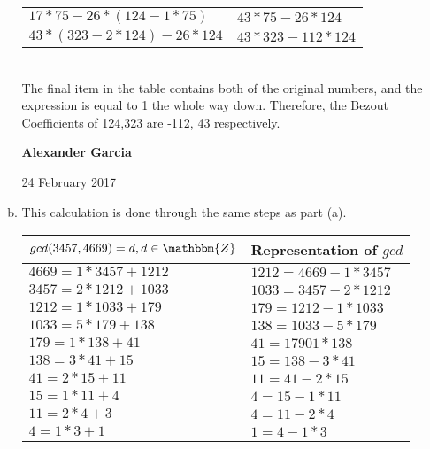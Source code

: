 \documentclass[11pt]{article}
\begin{document}
\begin{enumerate}
\begin{enumerate}[(a)]
\begin{tabular}{ll}
				$17 * 75 - 26 * (124 - 1 * 75)$ & $43 * 75 - 26 * 124$ \\

				$43 * (323 - 2 * 124) - 26 * 124$ & $43 * 323 - 112 * 124$ \\

			\end{tabular}\\

			The final item in the table contains both of the original numbers,
			and the expression is equal to 1 the whole way down. Therefore, the Bezout
			Coefficients of 124,323 are -112, 43 respectively. \\

			\newpage

			\textbf{Alexander Garcia}

			24 February 2017 \\

			\item This calculation is done through the same steps as part (a).
			
			\begin{tabular}{ll}
				$gcd(3457, 4669) = d, d \in \mathbbm{Z}$ & Representation of $gcd$ \\

				\hline

				$4669 = 1 * 3457 + 1212$ & $1212 = 4669 - 1 * 3457$ \\

				$3457 = 2 * 1212 + 1033$ & $1033 = 3457 - 2 * 1212$ \\

				$1212 = 1 * 1033 + 179$ & $179 = 1212 - 1 * 1033$ \\

				$1033 = 5 * 179 + 138$ & $138 = 1033 - 5 * 179$ \\

				$179 = 1 * 138 + 41$ & $41 = 179 0 1 * 138$ \\

				$138 = 3 * 41 + 15$ & $15 = 138 - 3 * 41$ \\

				$41 = 2 * 15 + 11$ & $11 = 41 - 2 * 15$ \\

				$15 = 1 * 11 + 4$ & $4 = 15 - 1 * 11$ \\

				$11 = 2 * 4 + 3$ & $4 = 11 - 2 * 4$ \\

				$4 = 1 * 3 + 1$ & $1 = 4 - 1 * 3$ \\


\end{tabular}
\end{enumerate}
\end{enumerate}
\end{document}
